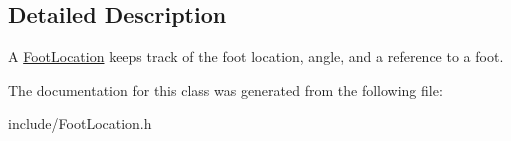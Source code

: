 \subsection{Detailed Description}
A \hyperlink{classfsp_1_1_foot_location}{Foot\-Location} keeps track of the foot location, angle, and a reference to a foot. 

The documentation for this class was generated from the following file\-:\begin{DoxyCompactItemize}
\item 
include/Foot\-Location.\-h\end{DoxyCompactItemize}
